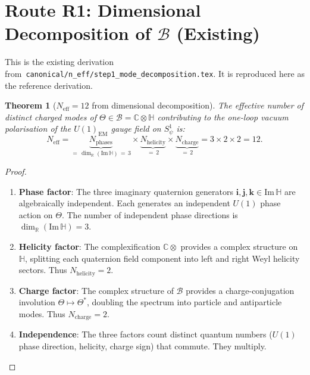 \documentclass[12pt,a4paper]{article}
\newtheorem{theorem}{Theorem}[section]
\theoremstyle{definition}
\theoremstyle{remark}
\begin{document}
\section{Route R1: Dimensional Decomposition of $\mathcal{B}$ (Existing)}
\label{sec:neff12:R1}

This is the existing derivation from~\texttt{canonical/n\_eff/step1\_mode\_decomposition.tex}.
It is reproduced here as the reference derivation.

\begin{theorem}[$N_{\mathrm{eff}} = 12$ from dimensional decomposition]
\label{thm:neff12:R1}
The effective number of distinct charged modes of $\Theta \in \mathcal{B} = \mathbb{C}\otimes\mathbb{H}$
contributing to the one-loop vacuum polarisation of the $U(1)_{\mathrm{EM}}$ gauge
field on $S^1_\psi$ is:
\begin{equation}
  N_{\mathrm{eff}}
  = \underbrace{N_{\mathrm{phases}}}_{=\,\dim_\mathbb{R}(\mathrm{Im}\,\mathbb{H})\,=\,3}
    \times
    \underbrace{N_{\mathrm{helicity}}}_{=\,2}
    \times
    \underbrace{N_{\mathrm{charge}}}_{=\,2}
  = 3 \times 2 \times 2
  = 12.
  \label{eq:neff12:R1}
\end{equation}
\end{theorem}

\begin{proof}
\begin{enumerate}
  \item \textbf{Phase factor}: The three imaginary quaternion generators
    $\mathbf{i}, \mathbf{j}, \mathbf{k} \in \mathrm{Im}\,\mathbb{H}$ are
    algebraically independent.  Each generates an independent $U(1)$ phase
    action on $\Theta$.  The number of independent phase directions is
    $\dim_\mathbb{R}(\mathrm{Im}\,\mathbb{H}) = 3$.

  \item \textbf{Helicity factor}: The complexification $\mathbb{C}\otimes$ provides
    a complex structure on $\mathbb{H}$, splitting each quaternion field component
    into left and right Weyl helicity sectors.  Thus $N_{\mathrm{helicity}} = 2$.

  \item \textbf{Charge factor}: The complex structure of $\mathcal{B}$ provides
    a charge-conjugation involution $\Theta \mapsto \Theta^*$, doubling the
    spectrum into particle and antiparticle modes.  Thus $N_{\mathrm{charge}} = 2$.

  \item \textbf{Independence}: The three factors count distinct quantum numbers
    ($U(1)$ phase direction, helicity, charge sign) that commute.  They multiply.
\end{enumerate}
\end{proof}
\end{document}
